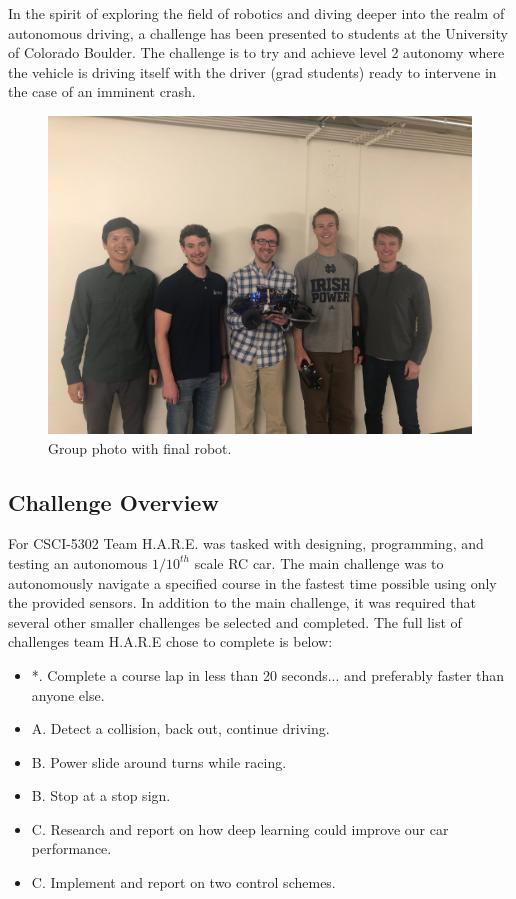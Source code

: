 \documentclass[letterpaper, 10 pt, conference]{ieeeconf}  %
\begin{document}
In the spirit of exploring the field of robotics and diving deeper into the realm of autonomous driving, a challenge has been presented to students at the University of Colorado Boulder. The challenge is to try and achieve level 2 autonomy where the vehicle is driving itself with the driver (grad students) ready to intervene in the case of an imminent crash.

\begin{figure}[h]
\begin{center}
\includegraphics[width=.48\textwidth]{Figures/group.jpg}
\caption{Group photo with final robot.}
\label{group}
\end{center}
\end{figure}

\subsection{Challenge Overview}

For CSCI-5302 Team H.A.R.E. was tasked with designing, programming, and testing an autonomous $1/10^{th}$ scale RC car. The main challenge was to autonomously navigate a specified course in the fastest time possible using only the provided sensors. In addition to the main challenge, it was required that several other smaller challenges be selected and completed. The full list of challenges team H.A.R.E chose to complete is below:

\begin{itemize}
  \item *. Complete a course lap in less than 20 seconds... and preferably faster than anyone else. 
  \item A. Detect a collision, back out, continue driving.
  \item B. Power slide around turns while racing. 
  \item B. Stop at a stop sign.
  \item C. Research and report on how deep learning could improve our car performance. 
  \item C. Implement and report on two control schemes. 
\end{itemize}
\end{document}
